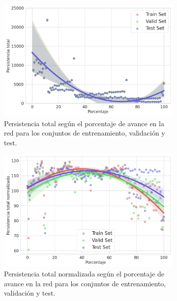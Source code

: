 \begin{figure}[H]
	\centering
	\begin{subfigure}{.45\textwidth}
		\centering
		\includegraphics[width=\linewidth]{img/mm_set_base.png}
		\caption{Persistencia total según el porcentaje de avance en la red para los conjuntos de entrenamiento, validación y test.}
		\label{fig:mm_set_base}
	\end{subfigure}
	\begin{subfigure}{.45\textwidth}
		\centering
		\includegraphics[width=\linewidth]{img/mm_set_base_norm.png}
		\caption{Persistencia total normalizada según el porcentaje de avance en la red para los conjuntos de entrenamiento, validación y test.}
		\label{fig:mm_set_base_norm}
	\end{subfigure}
	\begin{subfigure}{.45\textwidth}
		\centering

\end{subfigure}
\end{figure}
